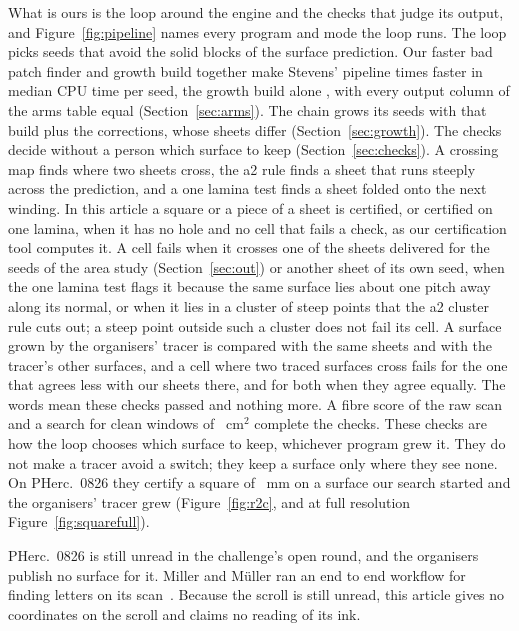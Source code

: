 What is ours is the loop around the engine and the checks that judge its output, and Figure~\ref{fig:pipeline} names
every program and mode the loop runs. The loop picks seeds that avoid the solid blocks of the surface prediction. Our faster
bad patch finder and growth build together make Stevens' pipeline \ArmFactorAC{} times faster in median CPU time per
seed, the growth build alone \ArmFactorBC{}, with every output column of the arms table equal (Section~\ref{sec:arms}).
The chain grows its seeds with that build plus the corrections, whose sheets differ (Section~\ref{sec:growth}). The checks decide without a person which surface to
keep (Section~\ref{sec:checks}). A crossing map finds where two sheets cross, the a2 rule finds a sheet that runs
steeply across the prediction, and a one lamina test finds a sheet folded onto the next winding. In this article a
square or a piece of a sheet is certified, or certified on one lamina, when it has no hole and no cell that fails a
check, as our certification tool computes it. A cell fails when it crosses one of the \UnionSheets{} sheets delivered
for the \AreaSeeds{} seeds of the area study (Section~\ref{sec:out}) or another sheet of its own seed, when the one
lamina test flags it because the same surface lies about one pitch away along its normal, or when it lies in a cluster
of steep points that the a2 cluster rule cuts out; a steep point outside such a cluster does not fail its cell. A
surface grown by the organisers' tracer is compared with the same \UnionSheets{} sheets and with the tracer's other
surfaces, and a cell where two traced surfaces cross fails for the one that agrees less with our sheets there, and for
both when they agree equally. The words mean these checks passed and nothing more. A fibre score of the raw scan and a search for clean
windows of \WinArea{}~cm$^2$ complete the checks. These checks are how the loop chooses which surface to
keep, whichever program grew it. They do not make a tracer avoid a switch; they keep a surface only where they see none.
On PHerc.~0826 they certify a square of \RcOneSquare{}~mm on a surface our search
started and the organisers' tracer grew (Figure~\ref{fig:r2c}, and at full resolution Figure~\ref{fig:squarefull}).

PHerc.~0826 is still unread in the challenge's open round, and the organisers publish no surface for it. Miller and
M\"uller ran an end to end workflow for finding letters on its scan~\cite{firstlight}. Because the scroll is still unread,
this article gives no coordinates on the scroll and claims no reading of its ink.

